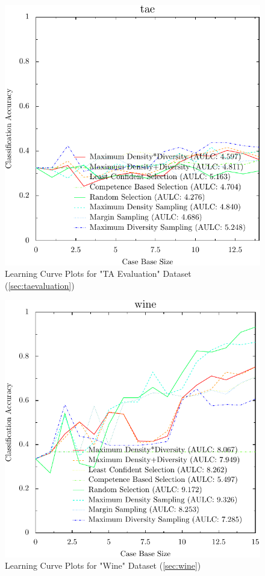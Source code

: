 \documentclass[a4paper,11pt]{report}
\begin{document}
\begin{figure}[h!]
\includegraphics{./Plots/tae}
\caption{Learning Curve Plots for "TA Evaluation" Dataset (\ref{sec:taevaluation})}
\end{figure}

\begin{figure}[h!]
\includegraphics{./Plots/wine}
\caption{Learning Curve Plots for "Wine" Dataset (\ref{sec:wine})}
\end{figure}
\end{document}
